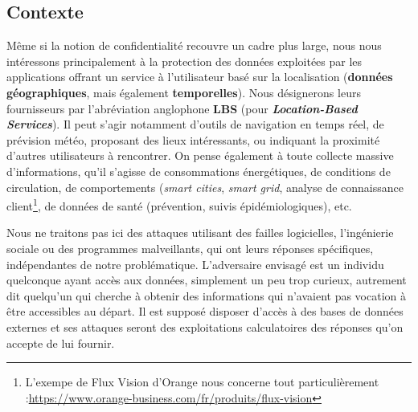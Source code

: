 \documentclass[a4paper,11pt]{article} %
\begin{document}
\subsection{Contexte}
%
Même si la notion de confidentialité recouvre un cadre plus large, nous nous intéressons principalement à la protection des données exploitées par les applications offrant un service à l'utilisateur basé sur la localisation (\textbf{données géographiques}, mais également \textbf{temporelles}).
Nous désignerons leurs fournisseurs par l'abréviation anglophone \textbf{LBS} (pour \emph{\textbf{Location-Based Services}}). 
Il peut s'agir notamment d'outils de navigation en temps réel, de prévision météo, proposant des lieux intéressants, ou indiquant la proximité d'autres utilisateurs à rencontrer. 
On pense également à toute collecte massive d'informations, qu'il s'agisse de consommations énergétiques, de conditions de circulation, de comportements (\emph{smart cities}, \emph{smart grid}, analyse de \og connaissance client\fg{}\footnote{L'exempe de Flux Vision d'Orange nous concerne tout particulièrement :\newline \url{https://www.orange-business.com/fr/produits/flux-vision}}, de données de santé (prévention, suivis épidémiologiques), etc.

Nous ne traitons pas ici des attaques utilisant des failles logicielles, l'ingénierie sociale ou des programmes malveillants, qui ont leurs réponses spécifiques, indépendantes de notre problématique. L'adversaire envisagé est un individu quelconque ayant accès aux données, simplement \og un peu trop curieux\fg{}, autrement dit quelqu'un qui cherche à obtenir des informations qui n'avaient pas vocation à être accessibles au départ. Il est supposé disposer d'accès à des bases de données externes et ses \og attaques\fg{} seront des exploitations calculatoires des réponses qu'on accepte de lui fournir.
%
\end{document}
